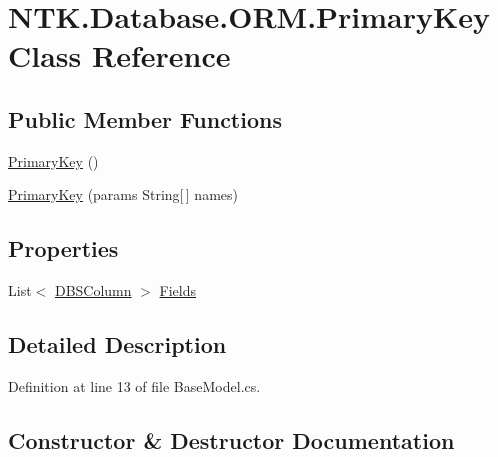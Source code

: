 \hypertarget{class_n_t_k_1_1_database_1_1_o_r_m_1_1_primary_key}{}\section{N\+T\+K.\+Database.\+O\+R\+M.\+Primary\+Key Class Reference}
\label{class_n_t_k_1_1_database_1_1_o_r_m_1_1_primary_key}


 


\subsection*{Public Member Functions}
\begin{DoxyCompactItemize}
\item 
\mbox{\hyperlink{class_n_t_k_1_1_database_1_1_o_r_m_1_1_primary_key_a163acc969cc9a1282de93691e2757555}{Primary\+Key}} ()
\item 
\mbox{\hyperlink{class_n_t_k_1_1_database_1_1_o_r_m_1_1_primary_key_a0df4cc8e60a24ffee002a8bcb135ee05}{Primary\+Key}} (params String\mbox{[}$\,$\mbox{]} names)
\end{DoxyCompactItemize}
\subsection*{Properties}
\begin{DoxyCompactItemize}
\item 
List$<$ \mbox{\hyperlink{class_n_t_k_1_1_database_1_1_d_b_s_column}{D\+B\+S\+Column}} $>$ \mbox{\hyperlink{class_n_t_k_1_1_database_1_1_o_r_m_1_1_primary_key_a0b37031f75b71dd7dabfb0343a946a8f}{Fields}}
\end{DoxyCompactItemize}


\subsection{Detailed Description}




Definition at line 13 of file Base\+Model.\+cs.



\subsection{Constructor \& Destructor Documentation}
\mbox{\label{class_n_t_k_1_1_database_1_1_o_r_m_1_1_primary_key_a163acc969cc9a1282de93691e2757555}} 
